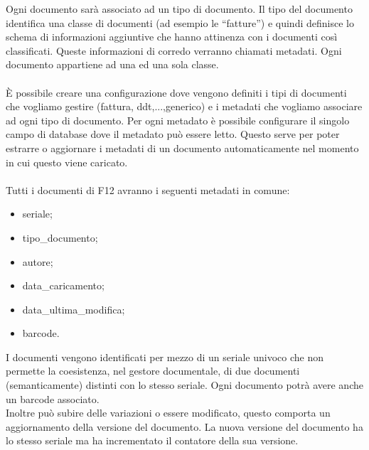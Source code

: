     Ogni documento sarà associato ad un tipo di documento. Il tipo del documento identifica una classe di documenti (ad esempio le “fatture”) e quindi definisce lo schema di informazioni aggiuntive che hanno attinenza con i documenti così classificati. Queste informazioni di corredo verranno chiamati metadati. Ogni documento appartiene ad una ed una sola classe.
    \\
    \\
    È possibile creare una configurazione dove vengono definiti i tipi di documenti che vogliamo gestire (fattura, ddt,...,generico) e i metadati che vogliamo associare ad ogni tipo di documento. Per ogni metadato è possibile configurare il singolo campo di database dove il metadato può essere letto. Questo serve per poter estrarre o aggiornare i metadati di un documento automaticamente nel momento in cui questo viene caricato.
    \\
    \\
    Tutti i documenti di F12 avranno i seguenti metadati in comune:
    \begin{itemize}
        \item seriale;
        
        \item tipo\_documento;
        
        \item autore;
        
        \item data\_caricamento;
        
        \item data\_ultima\_modifica;
        
        \item barcode.
    \end{itemize}
    
    I documenti vengono identificati per mezzo di un seriale univoco che non permette la coesistenza, nel gestore documentale, di due documenti (semanticamente) distinti con lo stesso seriale. Ogni documento potrà avere anche un barcode associato.
    \\
    Inoltre può subire delle variazioni o essere modificato, questo comporta un aggiornamento della versione del documento. La nuova versione del documento ha lo stesso seriale ma ha incrementato il contatore della sua versione.
    
